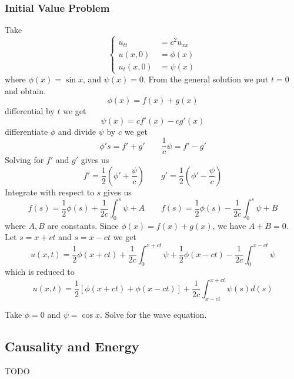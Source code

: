 \subsubsection{Initial Value Problem}
Take 
\[ \left\{ \begin{array}{rl} 
	u_{tt}  &= c^2 u_{xx}   \\
	u(x,0) &= \phi(x) \\
	u_t(x,0) &= \psi(x)
\end{array} \right. \]
where $\phi(x) = \sin x$, and $\psi(x) = 0$.
From the general solution we put $t = 0$ and obtain.
\[ \phi(x) = f(x) + g(x)\]
differential by $t$ we get
\[ \psi(x) = cf'(x) - cg'(x)\]
differentiate $\phi$ and divide $\psi$ by $c$ we get
\[ \phi's = f' + g' \qquad \frac1c \psi = f' - g'\]
Solving for $f'$ and $g'$ gives us
\[ f' = \frac 12 \left( \phi' + \frac \psi c \right) \qquad g' = \frac 12 \left( \phi' - \frac \psi c \right)  \]
Integrate with respect to $s$ gives us
\[ f(s) = \frac 12 \phi(s) + \frac 1{2c} \int_0^s \psi + A \qquad f(s) = \frac 12 \phi(s) - \frac 1{2c} \int_0^s \psi + B\]
where $A,B$ are constants. Since $\phi(x) = f(x) + g(x)$, we have $A + B = 0$. Let $s = x + ct$ and $s = x - ct$ we get
\[u(x, t)=\frac{1}{2} \phi(x+c t)+\frac{1}{2 c} \int_{0}^{x+c t} \psi+\frac{1}{2} \phi(x-c t)-\frac{1}{2 c} \int_{0}^{x-c t} \psi\]
which is reduced to 
\[ \boxed{u(x,t) = \frac12 \left[ \phi(x + ct) + \phi(x - ct) \right] + \frac 1 {2c} \int_{x - ct}^{x + ct} \psi(s) d(s)}\]
\begin{example}
	Take $\phi = 0$ and $\psi = \cos x$. Solve for the wave equation.
\end{example}

\subsection{Causality and Energy}
{\huge TODO}

